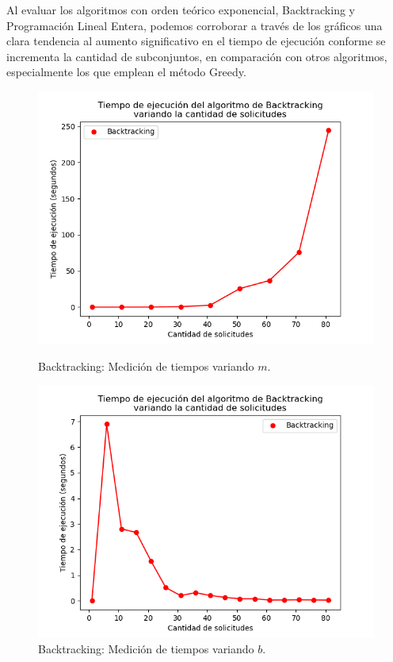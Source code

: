 Al evaluar los algoritmos con orden teórico exponencial, Backtracking y Programación Lineal Entera, podemos corroborar a través de los gráficos una clara tendencia al aumento significativo en el tiempo de ejecución conforme se incrementa la cantidad de subconjuntos, en comparación con otros algoritmos, especialmente los que emplean el método Greedy.

\begin{figure}[h]
    \centering
    \begin{minipage}{0.45\textwidth}
        \centering
        \includegraphics[width=\textwidth]{img/medicion_t_backtracking_var_m.png}
        \caption{Backtracking: Medición de tiempos variando $m$.}
        \label{fig:medicion_t_backtracking_var_m}
    \end{minipage}\hfill
    \begin{minipage}{0.45\textwidth}
        \centering
        \includegraphics[width=\textwidth]{img/medicion_t_backtracking_var_b.png}
        \caption{Backtracking: Medición de tiempos variando $b$.}
        \label{fig:medicion_t_backtracking_var_b}
    \end{minipage}
\end{figure}

